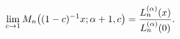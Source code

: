 \[\lim_{c\to 1}\mathop{M_{n}\/}\nolimits\!\left((1-c)^{-1}x;\alpha+1,c\right)=%
\frac{\mathop{L^{(\alpha)}_{n}\/}\nolimits\!\left(x\right)}{\mathop{L^{(\alpha%
)}_{n}\/}\nolimits\!\left(0\right)}.\]